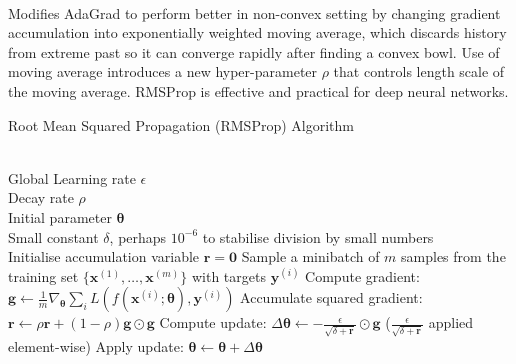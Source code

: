 \begin{remark} \\
Modifies AdaGrad to perform better in non-convex setting by changing gradient accumulation into exponentially weighted moving average, which discards history from extreme past so it can converge rapidly after finding a convex bowl. Use of moving average introduces a new hyper-parameter $\rho$ that controls length scale of the moving average. RMSProp is effective and practical for deep neural networks.
\end{remark}

\begin{breakablealgorithm}
\caption{Root Mean Squared Propagation (RMSProp) Algorithm}
\begin{algorithmic}
\Require \\
Global Learning rate $\epsilon$\\
Decay rate $\rho$\\
Initial parameter $\bm{\theta}$\\
Small constant $\delta$, perhaps $10^{-6}$ to stabilise division by small numbers\\

\State Initialise accumulation variable $\bm{r} = \bm{0}$
\State Sample a minibatch of $m$ samples from the training set $\{\bm{x}^{(1)}, \ldots, \bm{x}^{(m)} \}$ with targets $\bm{y}^{(i)}$
\State Compute gradient: $\bm{g} \leftarrow \frac{1}{m} \nabla_{\bm{\theta}} \sum_i L(f(\bm{x}^{(i)}; \bm{\theta}), \bm{y}^{(i)})$
\State Accumulate squared gradient: $\bm{r} \leftarrow \rho \bm{r} + (1 - \rho) \bm{g} \odot \bm{g}$
\State Compute update: $\Delta \bm{\theta} \leftarrow - \frac{\epsilon}{\sqrt{\delta + \bm{r}}} \odot \bm{g}$ ($\frac{\epsilon}{\sqrt{\delta + \bm{r}}}$ applied element-wise)
\State Apply update: $\bm{\theta} \leftarrow \bm{\theta} + \Delta \bm{\theta}$
\EndWhile
\end{algorithmic}
\end{breakablealgorithm}

